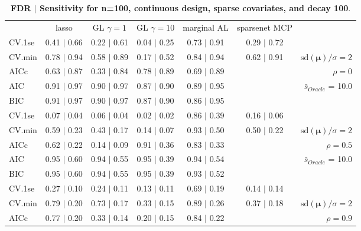 \clearpage
\begin{table}\vspace{-.5cm}
\caption[l]{ {\it }
{ \bf FDR $\boldsymbol{\mid}$ Sensitivity for n=100, continuous design, sparse covariates, and  decay  100}.}
\vspace{-.5cm}
\footnotesize{}
\begin{center}
\begin{tabular}{l*{5}{c}|r}
 & lasso & GL $\gamma=1$ & GL $\gamma=10$ & marginal AL & sparsenet MCP  & \\
 \cline{1-7}
CV.1se & 0.41 $\mid$ 0.66 & 0.22 $\mid$ 0.61 & 0.04 $\mid$ 0.25 & 0.73 $\mid$ 0.91 & 0.29 $\mid$ 0.72 & \\
CV.min & 0.78 $\mid$ 0.94 & 0.58 $\mid$ 0.89 & 0.17 $\mid$ 0.52 & 0.84 $\mid$ 0.94 & 0.62 $\mid$ 0.91 &  $\mathrm{sd}(\mathbf{\mu})/\sigma=2$ \\
AICc & 0.63 $\mid$ 0.87 & 0.33 $\mid$ 0.84 & 0.78 $\mid$ 0.89 & 0.69 $\mid$ 0.89 & & $\rho=0$ \\
AIC & 0.91 $\mid$ 0.97 & 0.90 $\mid$ 0.97 & 0.87 $\mid$ 0.90 & 0.89 $\mid$ 0.95 & &  \multirow{2}{*}{$\bar{s}_{Oracle}$ = 10.0} \\
BIC & 0.91 $\mid$ 0.97 & 0.90 $\mid$ 0.97 & 0.87 $\mid$ 0.90 & 0.86 $\mid$ 0.95 & &  \\
 \hline 
CV.1se & 0.07 $\mid$ 0.04 & 0.06 $\mid$ 0.04 & 0.02 $\mid$ 0.02 & 0.86 $\mid$ 0.39 & 0.16 $\mid$ 0.06 & \\
CV.min & 0.59 $\mid$ 0.23 & 0.43 $\mid$ 0.17 & 0.14 $\mid$ 0.07 & 0.93 $\mid$ 0.50 & 0.50 $\mid$ 0.22 &  $\mathrm{sd}(\mathbf{\mu})/\sigma=2$ \\
AICc & 0.62 $\mid$ 0.22 & 0.14 $\mid$ 0.09 & 0.91 $\mid$ 0.36 & 0.83 $\mid$ 0.33 & & $\rho=0.5$ \\
AIC & 0.95 $\mid$ 0.60 & 0.94 $\mid$ 0.55 & 0.95 $\mid$ 0.39 & 0.94 $\mid$ 0.54 & &  \multirow{2}{*}{$\bar{s}_{Oracle}$ = 10.0} \\
BIC & 0.95 $\mid$ 0.60 & 0.94 $\mid$ 0.55 & 0.95 $\mid$ 0.39 & 0.93 $\mid$ 0.52 & &  \\
 \hline 
CV.1se & 0.27 $\mid$ 0.10 & 0.24 $\mid$ 0.11 & 0.13 $\mid$ 0.11 & 0.69 $\mid$ 0.19 & 0.14 $\mid$ 0.14 & \\
CV.min & 0.79 $\mid$ 0.20 & 0.73 $\mid$ 0.17 & 0.33 $\mid$ 0.15 & 0.89 $\mid$ 0.26 & 0.37 $\mid$ 0.18 &  $\mathrm{sd}(\mathbf{\mu})/\sigma=2$ \\
AICc & 0.77 $\mid$ 0.20 & 0.33 $\mid$ 0.14 & 0.20 $\mid$ 0.15 & 0.84 $\mid$ 0.22 & & $\rho=0.9$ \\

\end{tabular}
\end{center}
\end{table}
